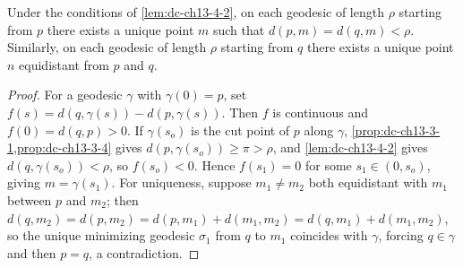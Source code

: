 \begin{lemma}
  \label{lem:dc-ch13-4-3}
  Under the conditions of \cref{lem:dc-ch13-4-2}, on each geodesic of length $\rho$ starting from
  $p$ there exists a unique point $m$ such that $d(p,m)=d(q,m)<\rho$. Similarly, on
  each geodesic of length $\rho$ starting from $q$ there exists a unique point $n$
  equidistant from $p$ and $q$.
\end{lemma}
\begin{proof}
\sketch
  For a geodesic $\gamma$ with $\gamma(0)=p$, set
  $f(s)=d(q,\gamma(s))-d(p,\gamma(s))$. Then $f$ is continuous and $f(0)=d(q,p)>0$. If
  $\gamma(s_o)$ is the cut point of $p$ along $\gamma$,
  \cref{prop:dc-ch13-3-1,prop:dc-ch13-3-4} gives
  $d(p,\gamma(s_o))\geq\pi>\rho$, and
  \cref{lem:dc-ch13-4-2} gives $d(q,\gamma(s_o))<\rho$, so $f(s_o)<0$. Hence $f(s_1)=0$ for some
  $s_1\in(0,s_o)$, giving $m=\gamma(s_1)$. For uniqueness, suppose $m_1\neq m_2$ both
  equidistant with $m_1$ between $p$ and $m_2$; then
  $d(q,m_2)=d(p,m_2)=d(p,m_1)+d(m_1,m_2)=d(q,m_1)+d(m_1,m_2)$, so the unique minimizing
  geodesic $\sigma_1$ from $q$ to $m_1$ coincides with $\gamma$, forcing $q\in\gamma$
  and then $p=q$, a contradiction.
\end{proof}

